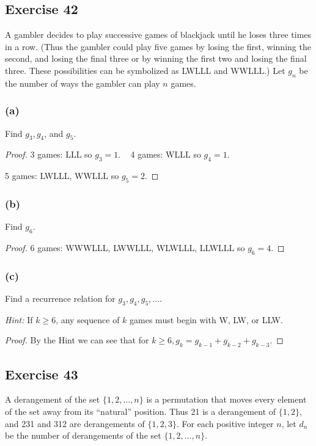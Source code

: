 \documentclass[14pt]{extarticle}
\begin{document}
\subsection{Exercise 42}
A gambler decides to play successive games of blackjack until he loses three times in a row. (Thus the gambler 
could play five games by losing the first, winning the second, and losing the final three or by winning the first 
two and losing the final three. These possibilities can be symbolized as LWLLL and WWLLL.) Let \(g_n\) be the number 
of ways the gambler can play $n$ games.

\subsubsection{(a)}
Find \(g_3, g_4\), and \(g_5\).

\begin{proof}
3 games: LLL so \(g_3 = 1\). \,\,\, 4 games: WLLL so \(g_4 = 1\). 

5 games: LWLLL, WWLLL so \(g_5 = 2\).
\end{proof}

\subsubsection{(b)}
Find \(g_6\).

\begin{proof}
6 games: WWWLLL, LWWLLL, WLWLLL, LLWLLL so \(g_6 = 4\).
\end{proof}

\subsubsection{(c)}
Find a recurrence relation for \(g_3, g_4, g_5, \ldots\).

{\it Hint:} If \(k \geq 6\), any sequence of $k$ games must begin with W, LW, or LLW.

\begin{proof}
By the Hint we can see that for \(k \geq 6, g_k = g_{k-1} + g_{k-2} + g_{k-3}\).
\end{proof}

\subsection{Exercise 43}
A derangement of the set \(\{1, 2, \ldots, n\}\) is a permutation that moves every element of the set away from 
its “natural” position. Thus 21 is a derangement of \(\{1, 2\}\), and 231 and 312 are derangements of \(\{1, 2, 3\}\). 
For each positive integer $n$, let \(d_n\) be the number of derangements of the set \(\{1, 2, \ldots, n\}\).
\end{document}
